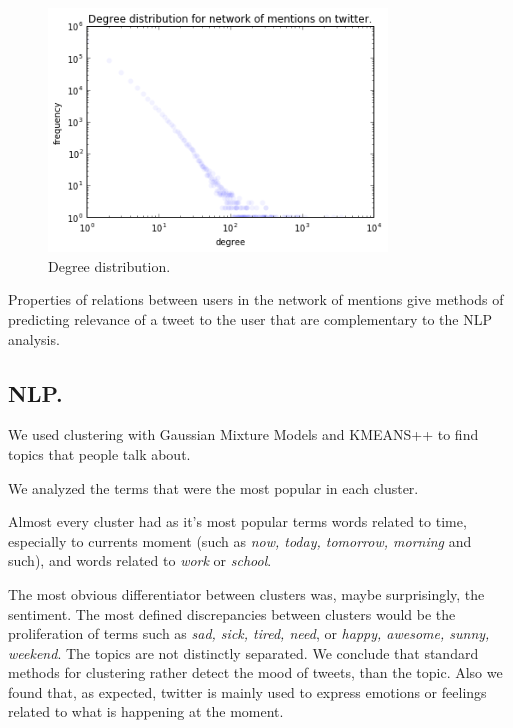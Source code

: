 \documentclass[%
 reprint,
 amsmath,amssymb,
 aps,
]{revtex4-1}
\begin{document}
\begin{figure}[htp]
\centering
\includegraphics[width=9cm]{deg_dist}
\caption{Degree distribution.}
\label{fig}
\end{figure}


Properties of relations between users in the network of mentions give methods of predicting relevance of a tweet to the user that are complementary to the NLP analysis.


\newpage

\subsection{NLP.}

We used clustering with Gaussian Mixture Models and KMEANS++ to find topics that people talk about.

We analyzed the terms that were the most popular in each cluster.

Almost every cluster had as it's most popular terms words related to time, especially to currents moment (such as \textit{now, today, tomorrow, morning} and such), and words related to \textit{work} or \textit{school}.

The most obvious differentiator between clusters was, maybe surprisingly, the sentiment. The most defined discrepancies between clusters would be the proliferation of terms such as \textit{sad, sick, tired, need}, or \textit{happy, awesome, sunny, weekend}. The topics are not distinctly separated. We conclude that standard methods for clustering rather detect the mood of tweets, than the topic. Also we found that, as expected, twitter is mainly used to express emotions or feelings related to what is happening at the moment. 
\end{document}
